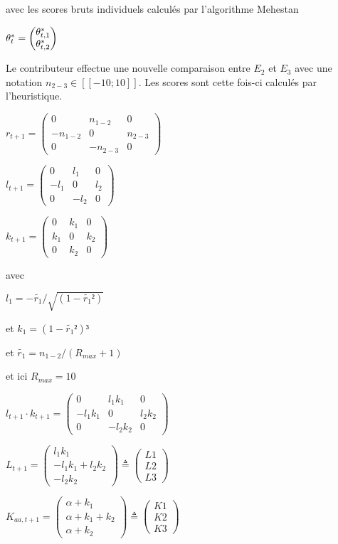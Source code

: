 avec les scores bruts individuels calculés par l'algorithme Mehestan

$\theta^*_{t}= \begin{pmatrix}
\theta^*_{t,1} \\
\theta^*_{t,2} 
\end{pmatrix}$

Le contributeur effectue une nouvelle comparaison entre $E_{2}$ et $E_{3}$ avec une notation $n_{2-3} \in [\![-10;10]\!]$. Les scores sont cette fois-ci calculés par l'heuristique.

$r_{t+1}= \begin{pmatrix}
0 & n_{1-2} & 0\\
-n_{1-2} & 0 & n_{2-3}\\
0 & -n_{2-3} & 0
\end{pmatrix}$

$l_{t+1}= \begin{pmatrix}
0 & l_1 & 0\\
-l_1 & 0 & l_2\\
0 & -l_2 & 0
\end{pmatrix}
$

$k_{t+1}= \begin{pmatrix}
0 & k_1 & 0\\
k_1 & 0 & k_2\\
0 & k_2 & 0
\end{pmatrix}
$

avec 

$l_1= -\tilde{r_1}/\sqrt{(1-\tilde{r_1}²)}$

et $k_1= (1-\tilde{r_1}²)³ $

et $\tilde{r_1} = n_{1-2}/(R_{max}+1)$

et ici $R_{max}=10$

$l_{t+1} \cdot k_{t+1}= \begin{pmatrix}
0 & l_1 k_1 & 0\\
-l_1 k_1 & 0 & l_2 k_2\\
0 & -l_2 k_2 & 0
\end{pmatrix}
$

$L_{t+1}= \begin{pmatrix}
l_1 k_1\\
-l_1 k_1 +l_2 k_2\\
-l_2 k_2
\end{pmatrix} \triangleq
\begin{pmatrix}
L1\\
L2\\
L3
\end{pmatrix} 
$

$K_{aa,t+1}= \begin{pmatrix}
\alpha + k_1\\
\alpha +  k_1 + k_2\\
\alpha + k_2
\end{pmatrix} \triangleq
\begin{pmatrix}
K1\\
K2\\
K3
\end{pmatrix} 
$



